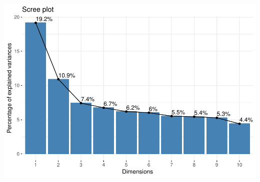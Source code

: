 \documentclass[]{article}
\begin{document}
\includegraphics{1_a_Simple_RMarkdown_PDF_files/figure-latex/visualize_ca_scree-1.pdf}
\end{document}
